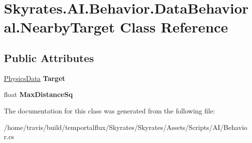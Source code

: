 \hypertarget{class_skyrates_1_1_a_i_1_1_behavior_1_1_data_behavioral_1_1_nearby_target}{\section{Skyrates.\-A\-I.\-Behavior.\-Data\-Behavioral.\-Nearby\-Target Class Reference}
\label{class_skyrates_1_1_a_i_1_1_behavior_1_1_data_behavioral_1_1_nearby_target}
}
\subsection*{Public Attributes}
\begin{DoxyCompactItemize}
\item 
\hypertarget{class_skyrates_1_1_a_i_1_1_behavior_1_1_data_behavioral_1_1_nearby_target_a5e02adf6cf2b0359cd845de2baa76c36}{\hyperlink{class_skyrates_1_1_physics_1_1_physics_data}{Physics\-Data} {\bfseries Target}}\label{class_skyrates_1_1_a_i_1_1_behavior_1_1_data_behavioral_1_1_nearby_target_a5e02adf6cf2b0359cd845de2baa76c36}

\item 
\hypertarget{class_skyrates_1_1_a_i_1_1_behavior_1_1_data_behavioral_1_1_nearby_target_a71554b043bfb8626ec8330c96a14d3b3}{float {\bfseries Max\-Distance\-Sq}}\label{class_skyrates_1_1_a_i_1_1_behavior_1_1_data_behavioral_1_1_nearby_target_a71554b043bfb8626ec8330c96a14d3b3}

\end{DoxyCompactItemize}


The documentation for this class was generated from the following file\-:\begin{DoxyCompactItemize}
\item 
/home/travis/build/temportalflux/\-Skyrates/\-Skyrates/\-Assets/\-Scripts/\-A\-I/Behavior.\-cs\end{DoxyCompactItemize}
